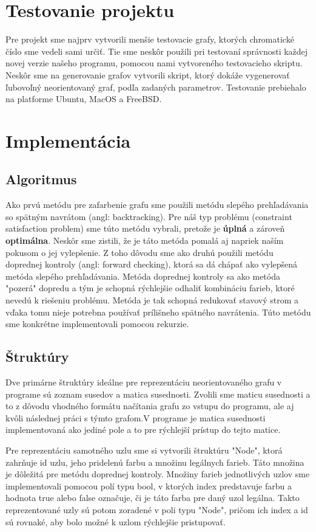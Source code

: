\documentclass[a4paper,11pt]{article}
\begin{document}
\section{Testovanie projektu}
Pre projekt sme najprv vytvorili menšie testovacie grafy, ktorých chromatické číslo sme vedeli sami určiť. Tie sme neskôr použili pri testovaní správnosti každej novej verzie našeho programu, pomocou nami vytvoreného testovacieho skriptu. Neskôr sme na generovanie grafov vytvorili skript, ktorý dokáže vygenerovať ľubovoľný neorientovaný graf, podľa zadaných parametrov. Testovanie prebiehalo na platforme Ubuntu, MacOS a FreeBSD.

\section{Implementácia}
\subsection{Algoritmus}
Ako prvú metódu pre zafarbenie grafu sme použili metódu slepého prehľadávania so spätným navrátom (angl: backtracking). Pre náš typ problému (constraint satisfaction problem) sme túto metódu vybrali, pretože je \textbf{úplná} a zároveň \textbf{optimálna}. Neskôr sme zistili, že je táto metóda pomalá aj napriek naším pokusom o jej vylepšenie. Z toho dôvodu sme ako druhú použili metódu doprednej kontroly (angl: forward checking), ktorá sa dá chápať ako vylepšená metóda slepého prehľadávania. Metóda doprednej kontroly sa ako metóda "pozerá" dopredu a tým je schopná rýchlejšie odhaliť kombináciu farieb, ktoré nevedú k riešeniu problému. Metóda je tak schopná redukovať stavový strom a vďaka tomu nieje potrebna používať prílišneho spätného navrátenia. Túto metódu sme konkrétne implementovali pomocou rekurzie.

\subsection{Štruktúry}
Dve primárne štruktúry ideálne pre reprezentáciu neorientovaného grafu v programe sú zoznam susedov a matica susednosti. Zvolili sme maticu susednosti a to z dôvodu vhodného formátu načítania grafu zo vstupu do programu, ale aj kvôli následnej práci s týmto grafom.V programe je matica susednosti implementovaná ako jediné pole a to pre rýchlejší prístup do tejto matice.

Pre reprezentáciu samotného uzlu sme si vytvorili štruktúru "Node", ktorá zahrňuje id uzlu, jeho pridelenú farbu a množinu legálnych farieb. Táto množina je dôležitá pre metódu doprednej kontroly. Množiny farieb jednotlivých uzlov sme implementovali pomocou polí typu bool, v ktorých index predstavuje farbu a hodnota true alebo false označuje, či je táto farba pre daný uzol legálna. Takto reprezentované uzly sú potom zoradené v poli typu "Node", pričom ich index a id sú rovnaké, aby bolo možné k uzlom rýchlejšie pristupovať.
\end{document}
